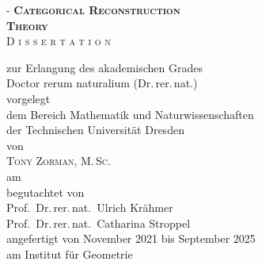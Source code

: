 \thispagestyle{empty}
\calccentering{\unitlength}
\begin{adjustwidth*}{\unitlength}{-\unitlength}
  \centering
  {\scshape\bfseries\Huge Categorical Reconstruction \\[0.2cm] Theory}\\
  \vspace{2.5cm}
  {\Huge\textsc{%
      D\hspace{0.05em}%
      i\hspace{0.05em}%
      s\hspace{0.05em}%
      s\hspace{0.05em}%
      e\hspace{0.05em}%
      r\hspace{0.05em}%
      t\hspace{0.02em}%
      a\hspace{0.02em}%
      t\hspace{0.05em}%
      i\hspace{0.05em}%
      o\hspace{0.05em}%
      n}}\\

  \vfill

  zur Erlangung des akademischen Grades\\
  {\large Doctor rerum naturalium (Dr.\,rer.\,nat.)}\\[1em]

  vorgelegt\\
  dem Bereich Mathematik und Naturwissenschaften\\
  der Technischen Universität Dresden\\
  von\\[1em]

  {\large\textsc{Tony Zorman, M.\,Sc.}}\\[1em]

  am \submissionDate{}\\[1em]

  begutachtet von\\
  Prof.\ Dr.\,rer.\,nat.\ Ulrich Krähmer\\
  Prof.\ Dr.\,rer.\,nat.\ Catharina Stroppel\\[3em]

  angefertigt von November 2021 bis September 2025\\
  am Institut für Geometrie
\end{adjustwidth*}

